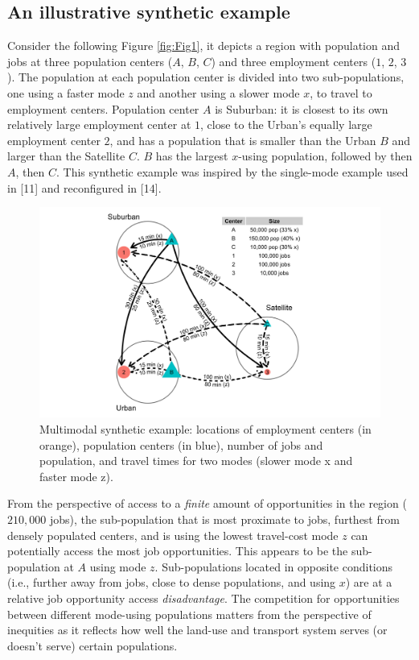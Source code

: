 \documentclass[10pt,letterpaper]{article}
\begin{document}
\hypertarget{an-illustrative-synthetic-example}{%
\subsection{An illustrative synthetic
example}\label{an-illustrative-synthetic-example}}

Consider the following Figure \ref{fig:Fig1}, it depicts a region with
population and jobs at three population centers (\(A\), \(B\), \(C\))
and three employment centers (\(1\), \(2\), \(3\)). The population at
each population center is divided into two sub-populations, one using a
faster mode \(z\) and another using a slower mode \(x\), to travel to
employment centers. Population center \(A\) is Suburban: it is closest
to its own relatively large employment center at \(1\), close to the
Urban's equally large employment center \(2\), and has a population that
is smaller than the Urban \(B\) and larger than the Satellite \(C\).
\(B\) has the largest \(x\)-using population, followed by then \(A\),
then \(C\). This synthetic example was inspired by the single-mode
example used in {[}11{]} and reconfigured in {[}14{]}.

\begin{figure}

{\centering \includegraphics[width=1\linewidth]{images/Fig1} 

}

\caption{\label{fig:Fig1} Multimodal synthetic example: locations of employment centers (in orange), population centers (in blue), number of jobs and population, and travel times for two modes (slower mode x and faster mode z).}\label{fig:synthetic-example-plot}
\end{figure}

From the perspective of access to a \emph{finite} amount of
opportunities in the region (\(210,000\) jobs), the sub-population that
is most proximate to jobs, furthest from densely populated centers, and
is using the lowest travel-cost mode \(z\) can potentially access the
most job opportunities. This appears to be the sub-population at \(A\)
using mode \(z\). Sub-populations located in opposite conditions (i.e.,
further away from jobs, close to dense populations, and using \(x\)) are
at a relative job opportunity access \emph{disadvantage}. The
competition for opportunities between different mode-using populations
matters from the perspective of inequities as it reflects how well the
land-use and transport system serves (or doesn't serve) certain
populations.
\end{document}
